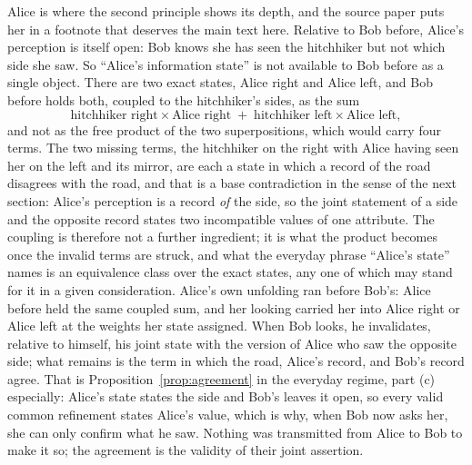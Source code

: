 Alice is where the second principle shows its depth, and the source paper puts her in a footnote that deserves the main text here. Relative to Bob before, Alice's perception is itself open: Bob knows she has seen the hitchhiker but not which side she saw. So ``Alice's information state'' is not available to Bob before as a single object. There are two exact states, Alice right and Alice left, and Bob before holds both, coupled to the hitchhiker's sides, as the sum
\[
\text{hitchhiker right}\times\text{Alice right}\;+\;\text{hitchhiker left}\times\text{Alice left},
\]
and not as the free product of the two superpositions, which would carry four terms. The two missing terms, the hitchhiker on the right with Alice having seen her on the left and its mirror, are each a state in which a record of the road disagrees with the road, and that is a base contradiction in the sense of the next section: Alice's perception is a record \emph{of} the side, so the joint statement of a side and the opposite record states two incompatible values of one attribute. The coupling is therefore not a further ingredient; it is what the product becomes once the invalid terms are struck, and what the everyday phrase ``Alice's state'' names is an equivalence class over the exact states, any one of which may stand for it in a given consideration. Alice's own unfolding ran before Bob's: Alice before held the same coupled sum, and her looking carried her into Alice right or Alice left at the weights her state assigned. When Bob looks, he invalidates, relative to himself, his joint state with the version of Alice who saw the opposite side; what remains is the term in which the road, Alice's record, and Bob's record agree. That is Proposition~\ref{prop:agreement} in the everyday regime, part (c) especially: Alice's state states the side and Bob's leaves it open, so every valid common refinement states Alice's value, which is why, when Bob now asks her, she can only confirm what he saw. Nothing was transmitted from Alice to Bob to make it so; the agreement is the validity of their joint assertion.

